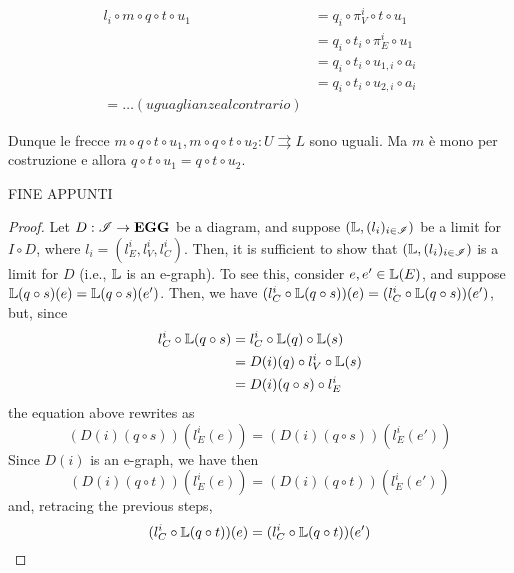 \begin{align*}
	l_i\circ m\circ q\circ t \circ u_1 &= q_i \circ \pi^{i}_V\circ t\circ u_1 \\&=q_i\circ t_i\circ \pi^i_E\circ u_1\\&=q_i\circ t_i\circ u_{1,i}\circ a_i\\&=q_i\circ t_i\circ u_{2,i}\circ a_i\\=\dots (uguaglianze al contrario)
\end{align*}

Dunque le frecce $m\circ q\circ t \circ u_1, m\circ q\circ t \circ u_2\colon U\rightrightarrows L$ sono uguali. Ma $m$ è mono per costruzione e allora $q\circ t \circ u_1=q\circ t \circ u_2$.

FINE APPUNTI 


\begin{proof}
	Let $D: \mathscr{I} \to \mathbf{EGG}$ be a diagram, and suppose $(\mathbb{L}, (l_i)_{i \in \mathscr{I}})$ be a limit for $I \circ D$, where $l_i = (l_E^i, l_V^i, l_C^i)$. Then, it is sufficient to show that $(\mathbb{L}, (l_i)_{i \in \mathscr{I}})$ is a limit for $D$ (i.e., $\mathbb{L}$ is an e-graph). To see this, consider $e, e' \in \mathbb{L}(E)$, and suppose $\mathbb{L}(q \circ s)(e) = \mathbb{L}(q \circ s)(e')$. Then, we have $(l_C^i \circ \mathbb{L}(q \circ s))(e) = (l_C^i \circ \mathbb{L}(q \circ s))(e')$, but, since
	\[\begin{split}
		l_C^i \circ \mathbb{L}(q \circ s) &= l_C^i \circ \mathbb{L}(q) \circ \mathbb{L}(s) \\
						   &= D(i)(q) \circ l_V^i \circ \mathbb{L}(s)	\\
						   &= D(i)(q \circ s)\circ l_E^i
	\end{split}\]
	the equation above rewrites as
	\[(D(i)(q \circ s))(l_E^i (e)) = (D(i)(q \circ s))(l_E^i (e')) \]
	Since $D(i)$ is an e-graph, we have then
	\[(D(i)(q \circ t))(l_E^i (e)) = (D(i)(q \circ t))(l_E^i (e')) \]
	and, retracing the previous steps, \[ (l_C^i \circ \mathbb{L}(q \circ t))(e) = (l_C^i \circ \mathbb{L}(q \circ t))(e')\]
\end{proof}

